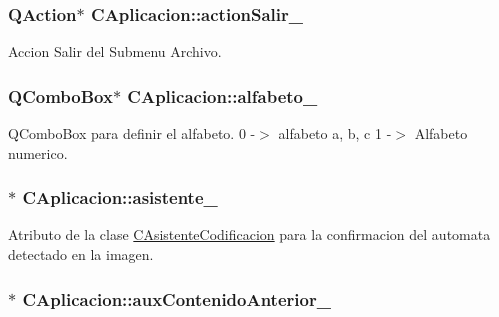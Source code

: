 \subsubsection[{\texorpdfstring{action\+Salir\+\_\+}{actionSalir_}}]{\setlength{\rightskip}{0pt plus 5cm}Q\+Action$\ast$ C\+Aplicacion\+::action\+Salir\+\_\+\hspace{0.3cm}{\ttfamily [private]}}\hypertarget{classCAplicacion_ac878000751c05f9491a9de6671e6cde0}{}\label{classCAplicacion_ac878000751c05f9491a9de6671e6cde0}


Accion Salir del Submenu Archivo. 

\subsubsection[{\texorpdfstring{alfabeto\+\_\+}{alfabeto_}}]{\setlength{\rightskip}{0pt plus 5cm}Q\+Combo\+Box$\ast$ C\+Aplicacion\+::alfabeto\+\_\+\hspace{0.3cm}{\ttfamily [private]}}\hypertarget{classCAplicacion_a2bc2fca932b919c027f2c4a35f837de0}{}\label{classCAplicacion_a2bc2fca932b919c027f2c4a35f837de0}


Q\+Combo\+Box para definir el alfabeto. 0 -\/$>$ alfabeto a, b, c 1 -\/$>$ Alfabeto numerico. 

\subsubsection[{\texorpdfstring{asistente\+\_\+}{asistente_}}]{$\ast$ C\+Aplicacion\+::asistente\+\_\+\hspace{0.3cm}{\ttfamily [private]}}\hypertarget{classCAplicacion_a73e41911955009775d15b51595507351}{}\label{classCAplicacion_a73e41911955009775d15b51595507351}


Atributo de la clase \hyperlink{classCAsistenteCodificacion}{C\+Asistente\+Codificacion} para la confirmacion del automata detectado en la imagen. 

\subsubsection[{\texorpdfstring{aux\+Contenido\+Anterior\+\_\+}{auxContenidoAnterior_}}]{$\ast$ C\+Aplicacion\+::aux\+Contenido\+Anterior\+\_\+\hspace{0.3cm}{\ttfamily [private]}}\hypertarget{classCAplicacion_a14caad4d922c616e5efcfcd2ef30c443}{}\label{classCAplicacion_a14caad4d922c616e5efcfcd2ef30c443}
